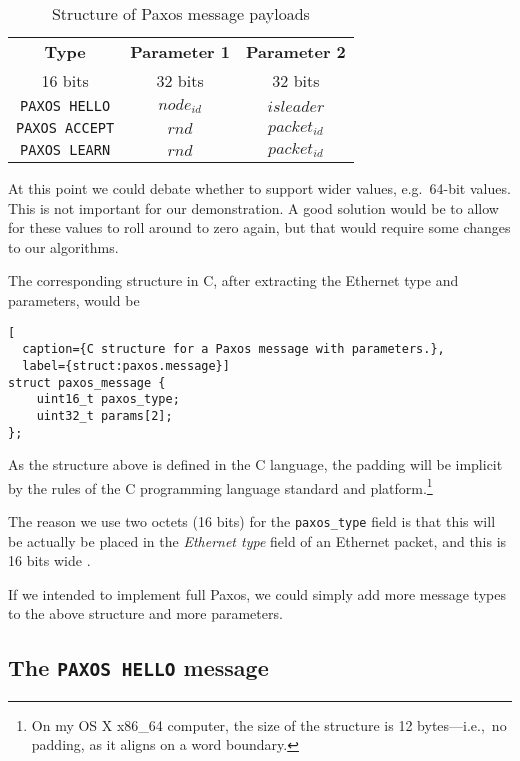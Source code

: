 \begin{table}[H]
  \centering
  \begin{tabular}{|c|c|c|}
    \hline \textbf{Type} & \textbf{Parameter 1} & \textbf{Parameter 2} \\
           16 bits & 32 bits & 32 bits \\
    \hline \texttt{PAXOS HELLO} & $node_{id}$ & $isleader$ \\
    \hline \texttt{PAXOS ACCEPT} & $rnd$ & $packet_{id}$ \\
    \hline \texttt{PAXOS LEARN} & $rnd$ & $packet_{id}$ \\
    \hline
  \end{tabular}
  \caption{Structure of Paxos message payloads}
  \label{table:paxos.payload.structure}
\end{table}

At this point we
could debate whether to support wider values, e.g.~64-bit values.
This is not important for our demonstration.  A good solution would be to
allow for these values to roll around to zero again, but that would require
some changes to our algorithms.

The corresponding structure in C, after extracting the Ethernet type and
parameters, would be

\begin{lstlisting}[
  caption={C structure for a Paxos message with parameters.},
  label={struct:paxos.message}]
struct paxos_message {
    uint16_t paxos_type;
    uint32_t params[2];
};
\end{lstlisting}

As the structure above is defined in the C language, the padding will be
implicit by the rules of the C programming language standard and
platform.\footnote{On my OS X x86\_{}64 computer, the size of the structure
is 12 bytes---i.e.,~no padding, as it aligns on a word boundary.}

The reason we use two octets (16 bits) for the \texttt{paxos\_{}type} field
is that this will be actually be placed in the \textit{Ethernet type} field
of an Ethernet packet, and this is 16 bits wide \cite{IEEE.802.3}.

If we intended to implement full Paxos, we could simply add more message
types to the above structure and more parameters.

\subsection{The \texttt{PAXOS HELLO} message}

